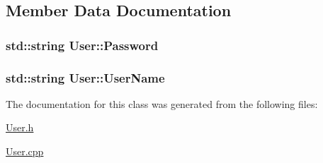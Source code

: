 \subsection{Member Data Documentation}
\hypertarget{classUser_a2a7a82b1a850021c64eca35d33ef333e}{
\subsubsection[{Password}]{\setlength{\rightskip}{0pt plus 5cm}std\-::string User\-::\-Password\hspace{0.3cm}{\ttfamily [private]}}}\label{classUser_a2a7a82b1a850021c64eca35d33ef333e}
\hypertarget{classUser_a37c0392ff3d39a659a153830c97d9105}{
\subsubsection[{User\-Name}]{\setlength{\rightskip}{0pt plus 5cm}std\-::string User\-::\-User\-Name\hspace{0.3cm}{\ttfamily [private]}}}\label{classUser_a37c0392ff3d39a659a153830c97d9105}


The documentation for this class was generated from the following files\-:\begin{DoxyCompactItemize}
\item 
\hyperlink{User_8h}{User.\-h}\item 
\hyperlink{User_8cpp}{User.\-cpp}\end{DoxyCompactItemize}
